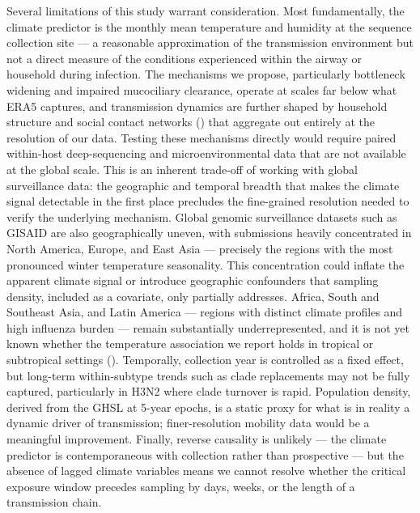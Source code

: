 \documentclass{pnas-new}
\begin{document}
Several limitations of this study warrant consideration. Most fundamentally, the climate predictor is the monthly mean temperature and humidity at the sequence collection site — a reasonable approximation of the transmission environment but not a direct measure of the conditions experienced within the airway or household during infection. The mechanisms we propose, particularly bottleneck widening and impaired mucociliary clearance, operate at scales far below what ERA5 captures, and transmission dynamics are further shaped by household structure and social contact networks (\cite{cauchemez_role_2011}) that aggregate out entirely at the resolution of our data. Testing these mechanisms directly would require paired within-host deep-sequencing and microenvironmental data that are not available at the global scale. This is an inherent trade-off of working with global surveillance data: the geographic and temporal breadth that makes the climate signal detectable in the first place precludes the fine-grained resolution needed to verify the underlying mechanism. Global genomic surveillance datasets such as GISAID are also geographically uneven, with submissions heavily concentrated in North America, Europe, and East Asia — precisely the regions with the most pronounced winter temperature seasonality. This concentration could inflate the apparent climate signal or introduce geographic confounders that sampling density, included as a covariate, only partially addresses. Africa, South and Southeast Asia, and Latin America — regions with distinct climate profiles and high influenza burden — remain substantially underrepresented, and it is not yet known whether the temperature association we report holds in tropical or subtropical settings (\cite{kimura_decoding_2026}). Temporally, collection year is controlled as a fixed effect, but long-term within-subtype trends such as clade replacements may not be fully captured, particularly in H3N2 where clade turnover is rapid. Population density, derived from the GHSL at 5-year epochs, is a static proxy for what is in reality a dynamic driver of transmission; finer-resolution mobility data would be a meaningful improvement. Finally, reverse causality is unlikely — the climate predictor is contemporaneous with collection rather than prospective — but the absence of lagged climate variables means we cannot resolve whether the critical exposure window precedes sampling by days, weeks, or the length of a transmission chain.
\end{document}
